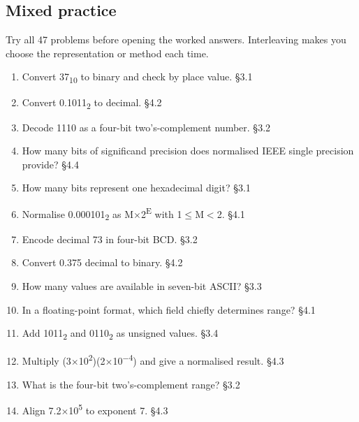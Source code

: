 \documentclass[11pt]{article}
\begin{document}
\begin{keepsection}
\section{Mixed practice}

Try all 47 problems before opening the worked answers. Interleaving makes you choose the representation or method each time.

\begin{enumerate}
\item Convert 37\textsubscript{10} to binary and check by place value. \hfill{\small\color{FAUblue}§3.1}
\item Convert 0.1011\textsubscript{2} to decimal. \hfill{\small\color{FAUblue}§4.2}
\item Decode 1110 as a four-bit two’s-complement number. \hfill{\small\color{FAUblue}§3.2}
\item How many bits of significand precision does normalised IEEE single precision provide? \hfill{\small\color{FAUblue}§4.4}
\item How many bits represent one hexadecimal digit? \hfill{\small\color{FAUblue}§3.1}
\item Normalise 0.000101\textsubscript{2} as M\ensuremath{\times}2\textsuperscript{E} with 1\ensuremath{\leq}M\ensuremath{<}2. \hfill{\small\color{FAUblue}§4.1}
\item Encode decimal 73 in four-bit BCD. \hfill{\small\color{FAUblue}§3.2}
\item Convert 0.375 decimal to binary. \hfill{\small\color{FAUblue}§4.2}
\item How many values are available in seven-bit ASCII? \hfill{\small\color{FAUblue}§3.3}
\item In a floating-point format, which field chiefly determines range? \hfill{\small\color{FAUblue}§4.1}
\item Add 1011\textsubscript{2} and 0110\textsubscript{2} as unsigned values. \hfill{\small\color{FAUblue}§3.4}
\item Multiply (3\ensuremath{\times}10\textsuperscript{2})(2\ensuremath{\times}10\textsuperscript{\ensuremath{-}4}) and give a normalised result. \hfill{\small\color{FAUblue}§4.3}
\item What is the four-bit two’s-complement range? \hfill{\small\color{FAUblue}§3.2}
\item Align 7.2\ensuremath{\times}10\textsuperscript{5} to exponent 7. \hfill{\small\color{FAUblue}§4.3}

\end{enumerate}
\end{keepsection}
\end{document}
